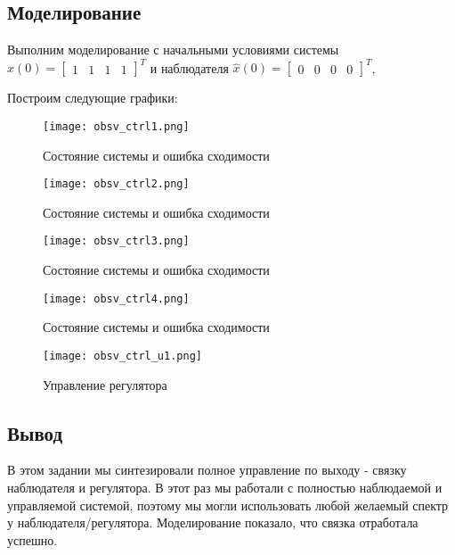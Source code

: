 \subsection{Моделирование}
Выполним  моделирование с начальными условиями системы 
  $x(0) = \begin{bmatrix} 1&1&1&1 \end{bmatrix}^T$ и наблюдателя $\hat{x}(0)=\begin{bmatrix}0 & 0& 0 &0\end{bmatrix}^T $,

  Построим следующие графики:
  \begin{figure}[ht]
    \centering
    \texttt{[image: obsv\_ctrl1.png]}
    \caption{Состояние системы и ошибка сходимости}
  \end{figure}
  \newpage
  \begin{figure}[ht]
    \centering
    \texttt{[image: obsv\_ctrl2.png]}
    \caption{Состояние системы и ошибка сходимости}
  \end{figure}
  \begin{figure}[ht]
    \centering
    \texttt{[image: obsv\_ctrl3.png]}
    \caption{Состояние системы и ошибка сходимости}
  \end{figure}
  \newpage
  \begin{figure}[ht]
    \centering
    \texttt{[image: obsv\_ctrl4.png]}
    \caption{Состояние системы и ошибка сходимости}
  \end{figure}
  \begin{figure}[ht]
    \centering
    \texttt{[image: obsv\_ctrl\_u1.png]}
    \caption{Управление регулятора}
  \end{figure}

\newpage
\subsection{Вывод}
В этом задании мы синтезировали полное управление по выходу - связку наблюдателя и регулятора. 
В этот раз мы работали с полностью наблюдаемой и управляемой системой, поэтому мы могли использовать любой желаемый спектр у наблюдателя/регулятора.
Моделирование показало, что связка отработала успешно.

\endinput